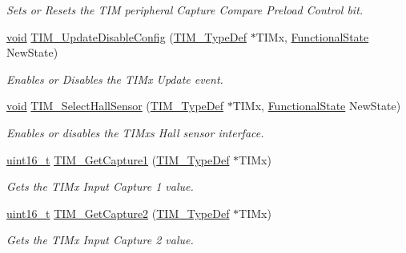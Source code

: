 \begin{DoxyCompactItemize}
\begin{DoxyCompactList}\small\item\em Sets or Resets the T\+IM peripheral Capture Compare Preload Control bit. \end{DoxyCompactList}\item 
\hyperlink{usb__devapi_8h_afabf60e7f57651d6d595a02c75f07cd0}{void} \hyperlink{group___t_i_m___exported___functions_gace2384dd33e849a054f61b8e1fc7e7c3}{T\+I\+M\+\_\+\+Update\+Disable\+Config} (\hyperlink{struct_t_i_m___type_def}{T\+I\+M\+\_\+\+Type\+Def} $\ast$T\+I\+Mx, \hyperlink{agilefox_2library_2inc_2stm32f10x__type_8h_ac9a7e9a35d2513ec15c3b537aaa4fba1}{Functional\+State} New\+State)
\begin{DoxyCompactList}\small\item\em Enables or Disables the T\+I\+Mx Update event. \end{DoxyCompactList}\item 
\hyperlink{usb__devapi_8h_afabf60e7f57651d6d595a02c75f07cd0}{void} \hyperlink{group___t_i_m___exported___functions_ga42c2d1025a3937c9d9f38631af86ffa4}{T\+I\+M\+\_\+\+Select\+Hall\+Sensor} (\hyperlink{struct_t_i_m___type_def}{T\+I\+M\+\_\+\+Type\+Def} $\ast$T\+I\+Mx, \hyperlink{agilefox_2library_2inc_2stm32f10x__type_8h_ac9a7e9a35d2513ec15c3b537aaa4fba1}{Functional\+State} New\+State)
\begin{DoxyCompactList}\small\item\em Enables or disables the T\+I\+Mx\textquotesingle{}s Hall sensor interface. \end{DoxyCompactList}\item 
\hyperlink{_p_e___types_8h_a1f1825b69244eb3ad2c7165ddc99c956}{uint16\+\_\+t} \hyperlink{group___t_i_m___exported___functions_ga29eb9f7151ceea94c3988539a5ee91cf}{T\+I\+M\+\_\+\+Get\+Capture1} (\hyperlink{struct_t_i_m___type_def}{T\+I\+M\+\_\+\+Type\+Def} $\ast$T\+I\+Mx)
\begin{DoxyCompactList}\small\item\em Gets the T\+I\+Mx Input Capture 1 value. \end{DoxyCompactList}\item 
\hyperlink{_p_e___types_8h_a1f1825b69244eb3ad2c7165ddc99c956}{uint16\+\_\+t} \hyperlink{group___t_i_m___exported___functions_ga437fcf00ee9d0a9df9150cc120efc5ad}{T\+I\+M\+\_\+\+Get\+Capture2} (\hyperlink{struct_t_i_m___type_def}{T\+I\+M\+\_\+\+Type\+Def} $\ast$T\+I\+Mx)
\begin{DoxyCompactList}\small\item\em Gets the T\+I\+Mx Input Capture 2 value. \end{DoxyCompactList}\item 

\end{DoxyCompactItemize}
